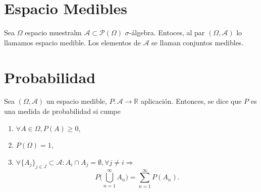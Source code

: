 \section{Espacio Medibles}

\begin{defn}
  Sea $\Omega$ espacio muestralm $\mathcal{A} \subset \mathcal{P}(\Omega)$ $\sigma$-álgebra. Entoces, al par $(\Omega, \mathcal{A})$ lo llamamos espacio medible. Los elementos de $\mathcal{A}$ se llaman conjuntos medibles.
\end{defn}

\section{Probabilidad}

\begin{defn}
  Sea $(\Omega, \mathcal{A})$ un espacio medible, $P: \mathcal{A} \to \mathbb{R}$ aplicación. Entonces, se dice que $P$ es una medida de probabilidad si cumpe
  \begin{enumerate}[label=(\roman*)]
    \item $\forall A \in \Omega, P(A) \geq 0$,
    \item $P(\Omega) = 1$,
    \item $\forall \{ A_{j} \}_{j \in J} \subset \mathcal{A}: A_{i} \cap A_{j} = \emptyset, \forall j \neq i \Rightarrow$
      \[ 
        P \Big ( \bigcup_{n = 1}^{\infty} A_{n} \Big ) = \sum_{ n = 1 }^{\infty} P(A_{n}).
      \] 
  \end{enumerate}
\end{defn}

